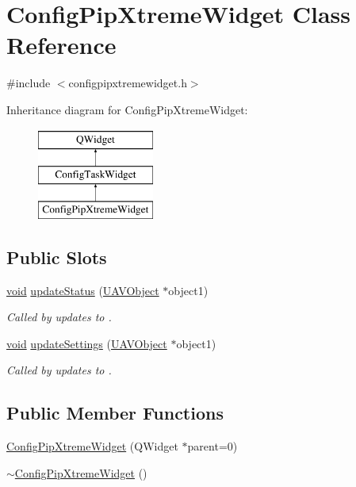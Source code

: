 \hypertarget{class_config_pip_xtreme_widget}{\section{Config\-Pip\-Xtreme\-Widget Class Reference}
\label{class_config_pip_xtreme_widget}
}


{\ttfamily \#include $<$configpipxtremewidget.\-h$>$}

Inheritance diagram for Config\-Pip\-Xtreme\-Widget\-:\begin{figure}[H]
\begin{center}
\leavevmode
\includegraphics[height=3.000000cm]{class_config_pip_xtreme_widget}
\end{center}
\end{figure}
\subsection*{Public Slots}
\begin{DoxyCompactItemize}
\item 
\hyperlink{group___u_a_v_objects_plugin_ga444cf2ff3f0ecbe028adce838d373f5c}{void} \hyperlink{group___config_plugin_gabc0f7192a99a705a14adb140f5ede521}{update\-Status} (\hyperlink{class_u_a_v_object}{U\-A\-V\-Object} $\ast$object1)
\begin{DoxyCompactList}\small\item\em Called by updates to . \end{DoxyCompactList}\item 
\hyperlink{group___u_a_v_objects_plugin_ga444cf2ff3f0ecbe028adce838d373f5c}{void} \hyperlink{group___config_plugin_gabf6dbd1961284c12d242657add38d28c}{update\-Settings} (\hyperlink{class_u_a_v_object}{U\-A\-V\-Object} $\ast$object1)
\begin{DoxyCompactList}\small\item\em Called by updates to . \end{DoxyCompactList}\end{DoxyCompactItemize}
\subsection*{Public Member Functions}
\begin{DoxyCompactItemize}
\item 
\hyperlink{group___config_plugin_ga93976625b77842e32b44100f87cad868}{Config\-Pip\-Xtreme\-Widget} (Q\-Widget $\ast$parent=0)
\item 
\hyperlink{group___config_plugin_ga225924f55de51a2a536ad41dba22fbc2}{$\sim$\-Config\-Pip\-Xtreme\-Widget} ()
\end{DoxyCompactItemize}

